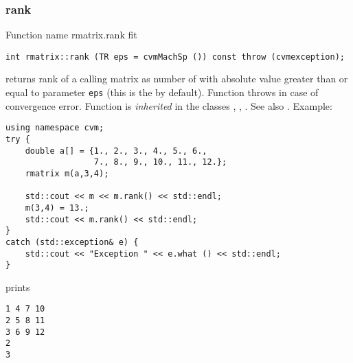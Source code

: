 \subsubsection{rank}
Function%
\pdfdest name {rmatrix.rank} fit
\begin{verbatim}
int rmatrix::rank (TR eps = cvmMachSp ()) const throw (cvmexception);
\end{verbatim}
returns  rank of a calling matrix as  number of
with 
absolute value greater than or
equal to  parameter \verb"eps" (this is the
 by default).
Function throws 
in case of convergence error.
Function is \emph{inherited} in the classes
,
,
.
See also
.
Example:
\begin{Verbatim}
using namespace cvm;
try {
    double a[] = {1., 2., 3., 4., 5., 6.,
                  7., 8., 9., 10., 11., 12.};
    rmatrix m(a,3,4);

    std::cout << m << m.rank() << std::endl;
    m(3,4) = 13.;
    std::cout << m.rank() << std::endl;
}
catch (std::exception& e) {
    std::cout << "Exception " << e.what () << std::endl;
}
\end{Verbatim}
prints
\begin{Verbatim}
1 4 7 10
2 5 8 11
3 6 9 12
2
3
\end{Verbatim}
\newpage




